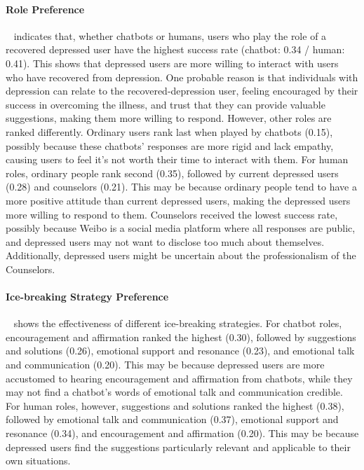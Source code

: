 \paragraph{Role Preference}
~ indicates that, whether chatbots or humans, users who play the role of a recovered depressed user have the highest success rate (chatbot: 0.34 / human: 0.41). This shows that depressed users are more willing to interact with users who have recovered from depression. One probable reason is that individuals with depression can relate to the recovered-depression user, feeling encouraged by their success in overcoming the illness, and trust that they can provide valuable suggestions, making them more willing to respond.
However, other roles are ranked differently. Ordinary users rank last when played by chatbots (0.15), possibly because these chatbots' responses are more rigid and lack empathy, causing users to feel it's not worth their time to interact with them. For human roles, ordinary people rank second (0.35), followed by current depressed users (0.28) and counselors (0.21). This may be because ordinary people tend to have a more positive attitude than current depressed users, making the depressed users more willing to respond to them. Counselors received the lowest success rate, possibly because Weibo is a social media platform where all responses are public, and depressed users may not want to disclose too much about themselves. Additionally, depressed users might be uncertain about the professionalism of the Counselors.

\paragraph{Ice-breaking Strategy Preference}
~ shows the effectiveness of different ice-breaking strategies. For chatbot roles, encouragement and affirmation ranked the highest (0.30), followed by suggestions and solutions (0.26), emotional support and resonance (0.23), and emotional talk and communication (0.20). This may be because depressed users are more accustomed to hearing encouragement and affirmation from chatbots, while they may not find a chatbot's words of emotional talk and communication credible. For human roles, however, suggestions and solutions ranked the highest (0.38), followed by emotional talk and communication (0.37), emotional support and resonance (0.34), and encouragement and affirmation (0.20). This may be because depressed users find the suggestions particularly relevant and applicable to their own situations.

